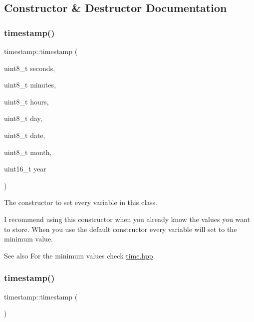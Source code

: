 \subsection{Constructor \& Destructor Documentation}
\mbox{\label{classtimestamp_adcd43bf86d093792baa6b406e0acafd3}} 
\subsubsection{\texorpdfstring{timestamp()}{timestamp()}\hspace{0.1cm}{\footnotesize\ttfamily [1/2]}}
{\footnotesize\ttfamily timestamp\+::timestamp (\begin{DoxyParamCaption}\item[{uint8\+\_\+t}]{seconds,  }\item[{uint8\+\_\+t}]{minutes,  }\item[{uint8\+\_\+t}]{hours,  }\item[{uint8\+\_\+t}]{day,  }\item[{uint8\+\_\+t}]{date,  }\item[{uint8\+\_\+t}]{month,  }\item[{uint16\+\_\+t}]{year }\end{DoxyParamCaption})}



The constructor to set every variable in this class. 

I recommend using this constructor when you already know the values you want to store. When you use the default constructor every variable will set to the minimum value. ~\newline
 \begin{DoxySeeAlso}{See also}
For the minimum values check \mbox{\hyperlink{time_8hpp_source}{time.\+hpp}}. 
\end{DoxySeeAlso}
\mbox{\label{classtimestamp_a155539f65cabcec4ed8120e7d531d92a}} 
\subsubsection{\texorpdfstring{timestamp()}{timestamp()}\hspace{0.1cm}{\footnotesize\ttfamily [2/2]}}
{\footnotesize\ttfamily timestamp\+::timestamp (\begin{DoxyParamCaption}{ }\end{DoxyParamCaption})}




